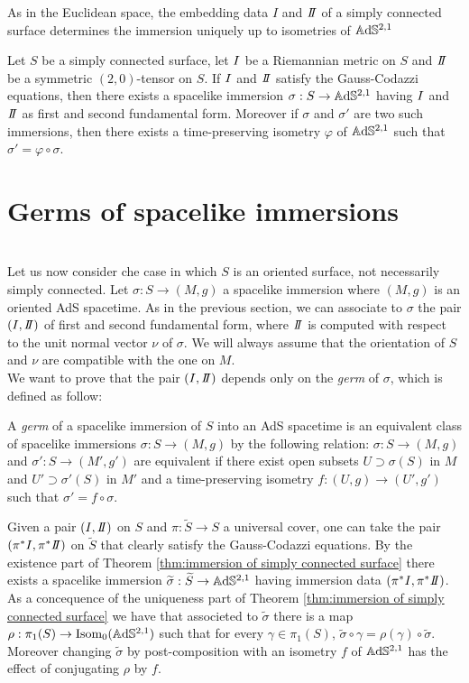 As in the Euclidean space, the embedding data $I$ and $\II$ of a simply connected surface determines the immersion uniquely up to isometries of $\mathbb{A}\mathrm{d}\mathbb{S}^{2,1}$
\begin{theorem}\label{thm:immersion of simply connected surface}
    Let $S$ be a simply connected surface, let $I$ be a Riemannian metric on $S$ and $\II$ be a symmetric $(2,0)$-tensor on $S$. If $I$ and $\II$ satisfy the Gauss-Codazzi equations, then there exists a spacelike immersion $\sigma:S \to\mathbb{A}\mathrm{d}\mathbb{S}^{2,1}$ having $I$ and $\II$ as first and second fundamental form. Moreover if $\sigma$ and $\sigma'$ are two such immersions, then there exists a time-preserving isometry $\varphi$ of $\mathbb{A}\mathrm{d}\mathbb{S}^{2,1}$ such that $\sigma' = \varphi \circ \sigma$.
\end{theorem}

\section{Germs of spacelike immersions}
\\
Let us now consider che case in which $S$ is an oriented surface, not necessarily simply connected. Let $\sigma: S \to(M,g)$ a spacelike immersion where $(M,g)$ is an oriented AdS spacetime.
As in the previous section, we can associate to $\sigma$ the pair $(\I,\II)$ of first and second  fundamental form, where $\II$ is  computed with respect to the unit normal vector $\nu$ of $\sigma$.
We will always assume that the orientation of $S$ and $\nu$ are compatible with the one on $M$.\\
We want to prove that the pair $(\I,\II)$ depends only on the \textit{germ} of $\sigma$, which is defined as follow:
\begin{definition}
    A \textit{germ} of a spacelike immersion of $S$ into an AdS spacetime is an equivalent class of spacelike immersions $\sigma:S \to(M,g)$ by the following relation: $\sigma:S \to(M,g)$ and $\sigma':S \to(M',g')$ are equivalent if there exist open subsets $U \supset \sigma(S)$ in $M$ and $U' \supset \sigma'(S)$ in $M'$ and a time-preserving isometry $f:(U,g)\to(U',g')$ such that $\sigma' = f \circ \sigma$.
\end{definition}
Given a pair $(\I,\II)$ on $S$ and $\pi: \widetilde{S}\to S$ a universal cover, one can take the pair $(\pi^*\I, \pi^*\II)$ on $\widetilde{S}$ that clearly satisfy the Gauss-Codazzi equations. By the existence part of Theorem \ref{thm:immersion of simply connected surface} there exists a spacelike immersion $\widetilde{\sigma}: \widetilde{S} \to\mathbb{A}\mathrm{d}\mathbb{S}^{2,1}$ having immersion data $(\pi^*\I, \pi^*\II)$. As a concequence of the uniqueness part of Theorem \ref{thm:immersion of simply connected surface} we have that associeted to $\widetilde{\sigma}$ there is a map $\rho:\pi_1(S) \to \text{Isom}_0(\mathbb{A}\mathrm{d}\mathbb{S}^{2,1})$ such that for every $\gamma \in \pi_1(S)$, $\widetilde{\sigma} \circ \gamma = \rho(\gamma) \circ \widetilde{\sigma}$. Moreover changing $\widetilde{\sigma}$ by post-composition with an isometry $f$ of $\mathbb{A}\mathrm{d}\mathbb{S}^{2,1}$ has the effect of conjugating $\rho$ by $f$.\\
